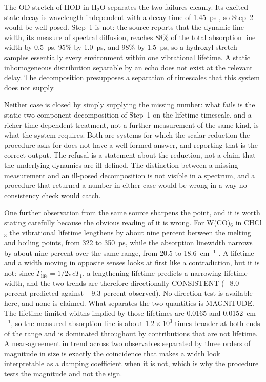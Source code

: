 The OD stretch of HOD in H$_2$O separates the two failures cleanly. Its excited
state decay is wavelength independent with a decay time of 1.45~ps \citep{steinel2004}, so Step~2
would be well posed. Step~1 is not: the source reports that the dynamic line width, its
measure of spectral diffusion, reaches 88\% of the total absorption line width by 0.5~ps,
95\% by 1.0~ps, and 98\% by 1.5~ps, so a hydroxyl stretch samples essentially every
environment within one vibrational lifetime. A static inhomogeneous distribution separable
by an echo does not exist at the relevant delay. The decomposition presupposes a
separation of timescales that this system does not supply.

Neither case is closed by simply supplying the missing number: what fails is the static two-component decomposition of Step~1 on the lifetime timescale, and a richer time-dependent treatment, not a further measurement of the same kind, is what the system requires.
Both are systems for which the scalar reduction the
procedure asks for does not have a well-formed answer, and reporting that is the
correct output. The refusal is a statement about the reduction, not a claim that
the underlying dynamics are ill defined. The distinction
between a missing measurement and an ill-posed decomposition is not visible in a
spectrum, and a procedure that returned a number in either case would be wrong
in a way no consistency check would catch.

One further observation from the same source sharpens the point, and it is
worth stating carefully because the obvious reading of it is wrong. For
W(CO)$_6$ in CHCl$_3$ the vibrational lifetime lengthens by about nine percent
between the melting and boiling points, from 322 to 350~ps, while the
absorption linewidth narrows by about nine percent over the same range, from
20.5 to 18.6~cm$^{-1}$ \citep{tokmakoff1994}. A lifetime and a width moving in
opposite senses looks at first like a contradiction, but it is not: since
$\widetilde{\Gamma}_{\mathrm{life}} = 1/2\pi cT_1$, a lengthening lifetime
predicts a narrowing lifetime width, and the two trends are therefore
directionally CONSISTENT ($-8.0$ percent predicted against $-9.3$ percent
observed). No direction test is available here, and none is claimed. What
separates the two quantities is MAGNITUDE. The lifetime-limited widths implied
by those lifetimes are 0.0165 and 0.0152~cm$^{-1}$, so the measured absorption
line is about $1.2\times10^{3}$ times broader at both ends of the range and is
dominated throughout by contributions that are not lifetime. A near-agreement
in trend across two observables separated by three orders of magnitude in size
is exactly the coincidence that makes a width look interpretable as a damping
coefficient when it is not, which is why the procedure tests the magnitude and
not the sign.

